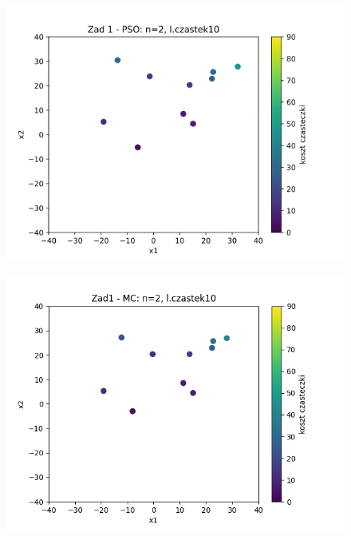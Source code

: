 \documentclass[11pt, a4paper, oneside]{article}
\begin{document}
\begin{figure}[H]
\centering
\begin{minipage}[b]{\dimexpr.5\textwidth-1em}
  \centering
  \includegraphics[width=1\linewidth]{grafiki/Wykresy2d/PSO_zad1_startPositions.png}
  \label{fig:pozycjeStartowe:PSO1}
\end{minipage} \hfill
\begin{minipage}[b]{\dimexpr.5\textwidth-1em}
  \centering
  \includegraphics[width=1\linewidth]{grafiki/Wykresy2d/MC_Zad1_startPositions.png}
  \label{fig:pozycjeStartowe:MC1}
\end{minipage}
\end{figure}
\end{document}
